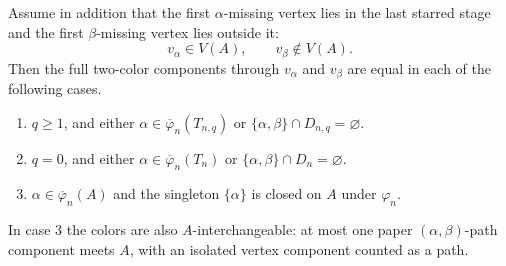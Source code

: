 \begin{lemma}
Assume in addition that the first $\alpha$-missing vertex lies in the
last starred stage and the first $\beta$-missing vertex lies outside it:
\[
        v_\alpha\in V(A),\qquad v_\beta\notin V(A).
\]
Then the full two-color components through $v_\alpha$ and $v_\beta$
are equal in each of the following cases.
\begin{enumerate}
\item $q\geq1$, and either
$\alpha\in\overline\varphi_n(T_{n,q})$ or
$\{\alpha,\beta\}\cap D_{n,q}=\varnothing$.
\item $q=0$, and either
$\alpha\in\overline\varphi_n(T_n)$ or
$\{\alpha,\beta\}\cap D_n=\varnothing$.
\item $\alpha\in\overline\varphi_n(A)$ and the singleton
$\{\alpha\}$ is closed on $A$ under $\varphi_n$.
\end{enumerate}
In case 3 the colors are also $A$-interchangeable: at most one paper
$(\alpha,\beta)$-path component meets $A$, with an isolated vertex
component counted as a path.
\end{lemma}

